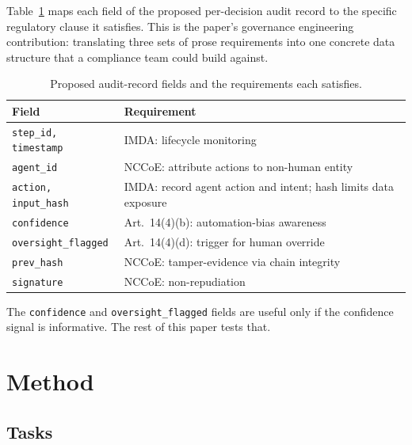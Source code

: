 \documentclass[10pt,twocolumn]{article}
\begin{document}
Table~\ref{tab:mapping} maps each field of the proposed per-decision audit
record to the specific regulatory clause it satisfies. This is the paper's
governance engineering contribution: translating three sets of prose requirements
into one concrete data structure that a compliance team could build against.

\begin{table}[t]
\centering\small
\setlength{\tabcolsep}{3.5pt}
\caption{Proposed audit-record fields and the requirements each satisfies.}
\label{tab:mapping}
\begin{tabular}{@{}p{3.0cm}p{4.7cm}@{}}
\toprule
\textbf{Field} & \textbf{Requirement} \\
\midrule
\texttt{step\_id, timestamp}    & IMDA: lifecycle monitoring \\
\texttt{agent\_id}              & NCCoE: attribute actions to
                                  non-human entity \\
\texttt{action, input\_hash}    & IMDA: record agent action and intent;
                                  hash limits data exposure \\
\texttt{confidence}             & Art.~14(4)(b): automation-bias
                                  awareness \\
\texttt{oversight\_flagged}     & Art.~14(4)(d): trigger for human
                                  override \\
\texttt{prev\_hash}             & NCCoE: tamper-evidence via chain
                                  integrity \\
\texttt{signature}              & NCCoE: non-repudiation \\
\bottomrule
\end{tabular}
\end{table}

The \texttt{confidence} and \texttt{oversight\_flagged} fields are useful only
if the confidence signal is informative. The rest of this paper tests that.

\section{Method}

\subsection{Tasks}
\end{document}
